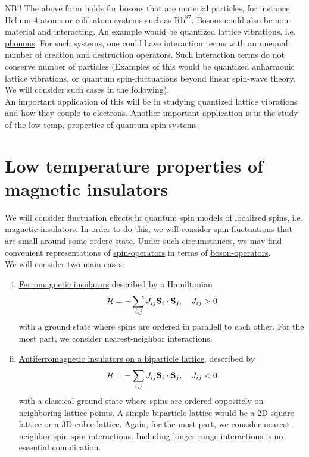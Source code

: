 NB!! The above form holds for bosons that are material particles, for instance Helium-4 atoms or cold-atom systems such as $\text{Rb}^{87}$. Bosons could also be non-material and interacting. An example would be quantized lattice vibrations, i.e. \uline{phonons}. For such systems, one could have interaction terms with an unequal number of creation and destruction operators. Such interaction terms do not conserve number of particles (Examples of this would be quantized anharmonic lattice vibrations, or quantum spin-fluctuations beyond linear spin-wave theory. We will consider such cases in the following). \\

An important application of this will be in studying quantized lattice vibrations and how they couple to electrons. Another important application is in the study of the low-temp. properties of quantum spin-systems. \\

\section{Low temperature properties of magnetic insulators}

We will consider fluctuation effects in quantum spin models of localized spins, i.e. magnetic insulators. In order to do this, we will consider spin-fluctuations that are small around some ordere state. Under such circumstances, we may find convenient representations of \uline{spin-operators} in terms of \uline{boson-operators}. \\

We will consider two main cases:
\begin{enumerate}[i)]
    \item \uline{Ferromagnetic insulators} described by a Hamiltonian
    \begin{equation}
        \mathcal{H} = -\sum_{i, j} J_{ij} \vb{S}_i\cdot\vb{S}_j, \quad J_{ij} > 0
    \end{equation}
    with a ground state where spins are ordered in parallell to each other. For the most part, we consider nearest-neighbor interactions.
    \item \uline{Antiferromagnetic insulators on a biparticle lattice}, described by
    \begin{equation}
        \mathcal{H} = -\sum_{i, j} J_{ij} \vb{S}_i\cdot\vb{S}_j, \quad J_{ij} < 0
    \end{equation}
    with a classical ground state where spins are ordered oppositely on neighboring lattice points. A simple biparticle lattice would be a 2D square lattice or a 3D cubic lattice. Again, for the most part, we consider nearest-neighbor spin-spin interactions. Including longer range interactions is no essential complication.
\end{enumerate}

